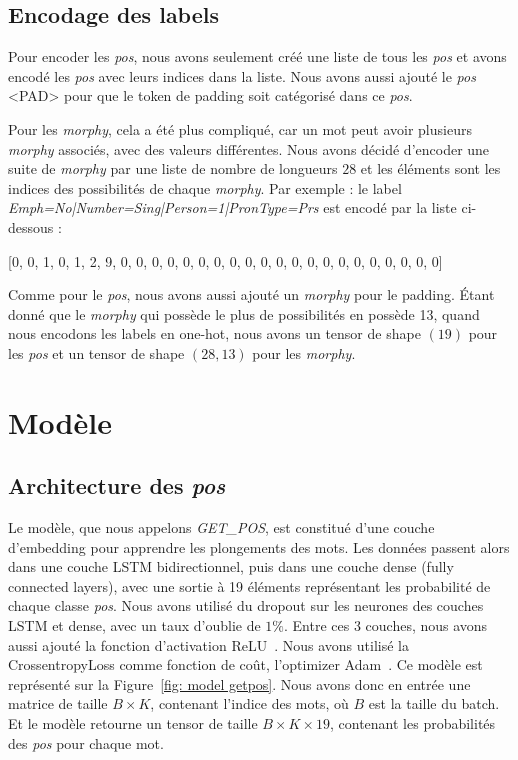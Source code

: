 \documentclass[a4paper]{article}
\begin{document}
\subsection{Encodage des labels}

Pour encoder les \textit{pos}, nous avons seulement créé une liste de tous les \textit{pos} et avons encodé les \textit{pos} avec 
leurs indices dans la liste.
Nous avons aussi ajouté le \textit{pos} <PAD> pour que le token de padding soit catégorisé dans ce \textit{pos}.


Pour les \textit{morphy}, cela a été plus compliqué, car un mot peut avoir plusieurs \textit{morphy} associés, avec des valeurs
différentes. Nous avons décidé d'encoder une suite de \textit{morphy} par une liste de nombre de longueurs $28$ et les éléments
sont les indices des possibilités de chaque
\textit{morphy}. Par exemple : le label \textit{Emph=No|Number=Sing|Person=1|PronType=Prs} est encodé par la liste ci-dessous :

[0, 0, 1, 0, 1, 2, 9, 0, 0, 0, 0, 0, 0, 0, 0, 0, 0, 0, 0, 0, 0, 0, 0, 0, 0, 0, 0, 0]

Comme pour le \textit{pos}, nous avons aussi ajouté un \textit{morphy} pour le padding. Étant donné que le \textit{morphy} qui possède
le plus de possibilités en possède 13, quand nous encodons les labels en one-hot, nous avons un tensor de shape
$(19)$ pour les \textit{pos} et un tensor de shape $(28, 13)$ pour les \textit{morphy}.


\section{Modèle}

\subsection{Architecture des \textit{pos}}

Le modèle, que nous appelons \textit{GET\_POS}, est constitué d'une couche d'embedding pour apprendre les plongements
des mots. Les données passent alors dans une couche LSTM bidirectionnel, puis dans une couche dense (fully connected layers),
avec une sortie à 19 éléments représentant les probabilité de chaque classe \textit{pos}. Nous avons utilisé du 
dropout sur les neurones des couches LSTM et dense, avec un taux d'oublie de $1\%$. Entre ces 3 couches, nous avons 
aussi ajouté la fonction d'activation ReLU~\cite{DBLP:journals/corr/abs-1803-08375}. Nous avons utilisé la CrossentropyLoss 
comme fonction de coût, l'optimizer Adam~\cite{kingma2014adam}. Ce modèle est représenté sur la Figure~\ref{fig: model getpos}.
Nous avons donc en entrée une matrice de taille $B \times K$, contenant l'indice des mots, où $B$ est la taille du batch.
 Et le modèle retourne un tensor de taille $B \times K \times 19$, contenant les probabilités des \textit{pos} pour chaque mot.
\end{document}

